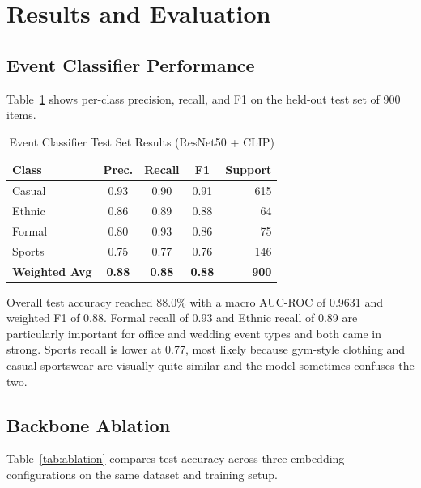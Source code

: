 \documentclass[conference]{IEEEtran}
\begin{document}
\section{Results and Evaluation}

\subsection{Event Classifier Performance}

Table~\ref{tab:results} shows per-class precision, recall, and F1 on the held-out test set of 900 items.

\begin{table}[htbp]
\caption{Event Classifier Test Set Results (ResNet50 + CLIP)}
\begin{center}
\renewcommand{\arraystretch}{1.2}
\begin{tabular}{|l|c|c|c|r|}
\hline
\textbf{Class} & \textbf{Prec.} & \textbf{Recall} & \textbf{F1} & \textbf{Support} \\
\hline
Casual  & 0.93 & 0.90 & 0.91 & 615 \\
Ethnic  & 0.86 & 0.89 & 0.88 &  64 \\
Formal  & 0.80 & 0.93 & 0.86 &  75 \\
Sports  & 0.75 & 0.77 & 0.76 & 146 \\
\hline
\textbf{Weighted Avg} & \textbf{0.88} & \textbf{0.88} & \textbf{0.88} & \textbf{900} \\
\hline
\end{tabular}
\label{tab:results}
\end{center}
\end{table}

Overall test accuracy reached 88.0\% with a macro AUC-ROC of 0.9631 and weighted F1 of 0.88. Formal recall of 0.93 and Ethnic recall of 0.89 are particularly important for office and wedding event types and both came in strong. Sports recall is lower at 0.77, most likely because gym-style clothing and casual sportswear are visually quite similar and the model sometimes confuses the two.

\subsection{Backbone Ablation}

Table~\ref{tab:ablation} compares test accuracy across three embedding configurations on the same dataset and training setup.
\end{document}
